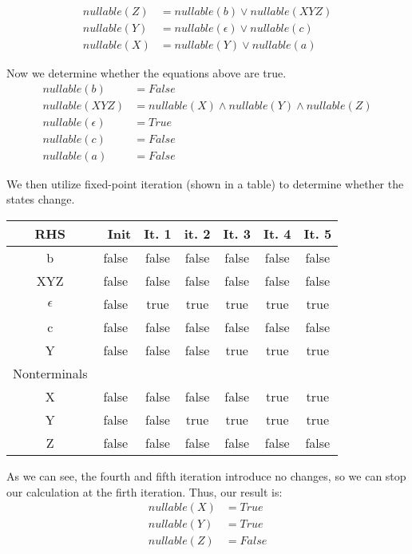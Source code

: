\documentclass{article}
\begin{document}
\begin{align*}
nullable(Z) &= nullable(b) \vee nullable(XYZ)\\
nullable(Y) &= nullable(\epsilon) \vee nullable(c)\\
nullable(X) &= nullable(Y) \vee nullable(a)
\end{align*}

Now we determine whether the equations above are true.
\begin{align*}
nullable(b) &= False\\
nullable(XYZ) &= nullable(X)\wedge nullable(Y)\wedge nullable(Z)\\
nullable(\epsilon) &= True\\
nullable(c) &= False\\
nullable(a) &= False
\end{align*}

We then utilize fixed-point iteration (shown in a table) to determine whether the states change.
\begin{table}[h]
\begin{center}
\begin{tabular}{|c|c|c|c|c|c|c|}
\hline
RHS & Init & It. 1 & it. 2 & It. 3 & It. 4 & It. 5\\
\hline
b & false & false & false & false & false & false\\
\hline
XYZ & false & false & false & false & false & false\\
\hline
\(\epsilon\) & false & true & true & true & true & true\\
\hline
c & false & false & false & false & false & false\\
\hline
Y & false & false & false & true & true & true\\
\hline
Nonterminals & & & & & & \\
\hline
X & false & false & false & false & true & true\\
\hline
Y & false & false & true & true & true & true\\
\hline
Z & false & false & false & false & false & false\\
\hline
\end{tabular}
\end{center}
\end{table}
As we can see, the fourth and fifth iteration introduce no changes, so we can stop our calculation at the firth iteration. Thus, our result is:
\begin{align*}
nullable(X) &= True\\
nullable(Y) &= True\\
nullable(Z) &= False
\end{align*}
\end{document}
